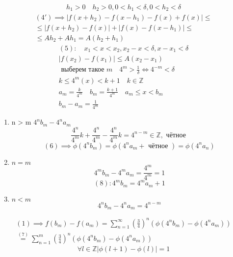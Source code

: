 \documentclass[main]{subfiles}
\begin{document}
\begin{example}
\begin{gather*}
          h_1 > 0 \quad h_2 > 0, 0 < h_1 < \delta, 0 <  h_2 < \delta \end{gather*}
          \begin{multline*}
          (4\prime) \implies |f(x+h_2) - f(x-h_1) -f(x) + f(x)| \leq \\ 
          \leq  |f(x+h_2)-f(x)| + |f(x) - f(x-h_1)| \leq \\
          \leq Ah_2 + Ah_1 = A(h_2 + h_1) \tag{5} \end{multline*}
          \begin{gather*}
          (5): \quad x_1 < x < x_2, x_2 - x  < \delta, x - x_1 < \delta \\
          |f(x_2) - f(x_1)| \leq A(x_2-x_1) \tag{5\prime} \\
          \text{ выберем такое } m \quad 4^m > \frac{1}{\delta} \Leftrightarrow 4^{-m} < \delta \\
          k \leq 4^m(x) < k+1 \quad k \in \mathbb{Z} \\     
          a_m = \frac{k}{4^m} \quad b_m = \frac{k+1}{4^m} \quad a_m \leq x < b_m \\
          b_m - a_m = \frac{1}{4^m} 
     \end{gather*}
          \begin{enumerate}
          \item n > m          
          $4^nb_m-4^na_m$ \\
          \[\frac{4^n}{4^m}k + \frac{4^n}{4^m} - \frac{4^n}{4^m}k = 4^{n-m} \in \mathbb{Z}, \text{ чётное } \tag{6} \]
          \[(6) \implies \phi(4^nb_m) = \phi(4^na_m + \text { чётное }) =  \phi(4^na_n) \tag{7} \]
          \item $n = m$ \\
           \[4^mb_m - 4^ma_m = \frac{4^m}{4^m} = 1 \tag{8} \]
          \[(8): 4^mb_m = 4^m a_m + 1 \] 
          \item $ n < m $
          \[ 4^nb_m - 4^na_m = 4^{n-m} \tag{9} \]
          \end{enumerate}
          \begin{multline*}
          (1) \implies f(b_m) - f(a_m) = \sum^\infty_{n=1} \left( \frac{3}{4} \right) ^n (\phi(4^nb_m) - \phi(4^na_m)) \\
          \stackrel{(7)}{=} \sum^m_{n=1} \left( \frac{3}{4} \right)^n(\phi(4^nb_m) - \phi(4^na_m)) \tag{10} \end{multline*}
          \[\forall l \in \mathbb{Z} |\phi(l+1) - \phi(l)| = 1 \tag{11} \]
          \begin{multline*}

\end{multline*}
\end{example}
\end{document}
